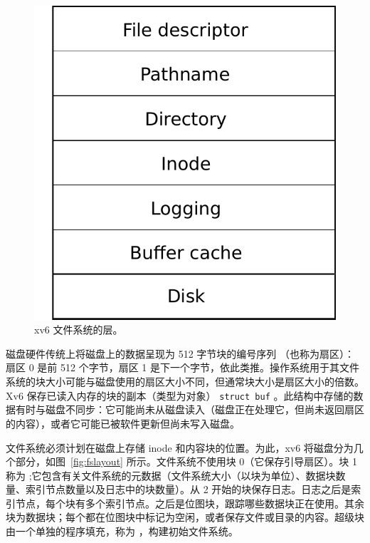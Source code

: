    \begin{figure}[t]
\center
\includegraphics[scale=0.5]{fig/fslayer.pdf}
\caption{xv6 文件系统的层。  }
\label{fig:fslayer}
\end{figure}     

磁盘硬件传统上将磁盘上的数据呈现为 512 字节块的编号序列
       （也称为扇区）：
        扇区 0 是前 512 个字节，扇区 1 是下一个字节，依此类推。操作系统用于其文件系统的块大小可能与磁盘使用的扇区大小不同，但通常块大小是扇区大小的倍数。 Xv6 保存已读入内存的块的副本（类型为对象）
    \lstinline{struct buf}   
        。此结构中存储的数据有时与磁盘不同步：它可能尚未从磁盘读入（磁盘正在处理它，但尚未返回扇区的内容），或者它可能已被软件更新但尚未写入磁盘。  

文件系统必须计划在磁盘上存储 inode 和内容块的位置。为此，xv6 将磁盘分为几个部分，如图~\ref{fig:fslayout}    所示。文件系统不使用块 0（它保存引导扇区）。块 1 称为
       ;它包含有关文件系统的元数据（文件系统大小（以块为单位）、数据块数量、索引节点数量以及日志中的块数量）。从 2 开始的块保存日志。日志之后是索引节点，每个块有多个索引节点。之后是位图块，跟踪哪些数据块正在使用。其余块为数据块；每个都在位图块中标记为空闲，或者保存文件或目录的内容。超级块由一个单独的程序填充，称为
        ，构建初始文件系统。  

